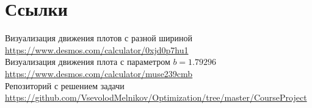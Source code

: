 \newpage

\section{Ссылки}
\noindent [1] Визуализация движения плотов с разной шириной \\
{\url{https://www.desmos.com/calculator/0xjd0p7hu1}} \\
\noindent [2] Визуализация движения плота с параметром $b=1.79296$ \\
{\url{https://www.desmos.com/calculator/muse239cmb}} \\
\noindent [3] Репозиторий с решением задачи \\
{\url{https://github.com/VsevolodMelnikov/Optimization/tree/master/CourseProject}}
		

